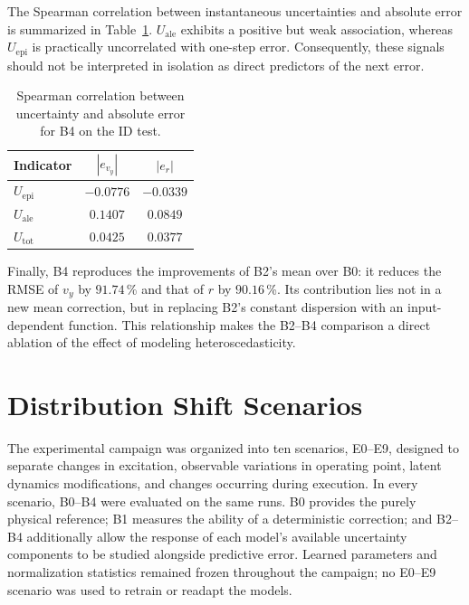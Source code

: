 \documentclass[12pt,a4paper]{report}
\begin{document}
The Spearman correlation between instantaneous uncertainties and absolute error is summarized in Table~\ref{tab:b4_uncertainty_error_correlation}. $U_{\mathrm{ale}}$ exhibits a positive but weak association, whereas $U_{\mathrm{epi}}$ is practically uncorrelated with one-step error. Consequently, these signals should not be interpreted in isolation as direct predictors of the next error.

\begin{table}[htbp]
    \centering
    \caption{Spearman correlation between uncertainty and absolute error for B4 on the ID test.}
    \label{tab:b4_uncertainty_error_correlation}
    \begin{tabular}{@{}lcc@{}}
        \toprule
        Indicator & $|e_{v_y}|$ & $|e_r|$ \\
        \midrule
        $U_{\mathrm{epi}}$ & $-0.0776$ & $-0.0339$ \\
        $U_{\mathrm{ale}}$ & $0.1407$ & $0.0849$ \\
        $U_{\mathrm{tot}}$ & $0.0425$ & $0.0377$ \\
        \bottomrule
    \end{tabular}
\end{table}

Finally, B4 reproduces the improvements of B2's mean over B0: it reduces the RMSE of $v_y$ by $91.74$\,\% and that of $r$ by $90.16$\,\%. Its contribution lies not in a new mean correction, but in replacing B2's constant dispersion with an input-dependent function. This relationship makes the B2--B4 comparison a direct ablation of the effect of modeling heteroscedasticity.

\section{Distribution Shift Scenarios}
\label{sec:escenarios_cambio_distribucion}

The experimental campaign was organized into ten scenarios, E0--E9, designed to separate changes in excitation, observable variations in operating point, latent dynamics modifications, and changes occurring during execution. In every scenario, B0--B4 were evaluated on the same runs. B0 provides the purely physical reference; B1 measures the ability of a deterministic correction; and B2--B4 additionally allow the response of each model's available uncertainty components to be studied alongside predictive error. Learned parameters and normalization statistics remained frozen throughout the campaign; no E0--E9 scenario was used to retrain or readapt the models.
\end{document}

